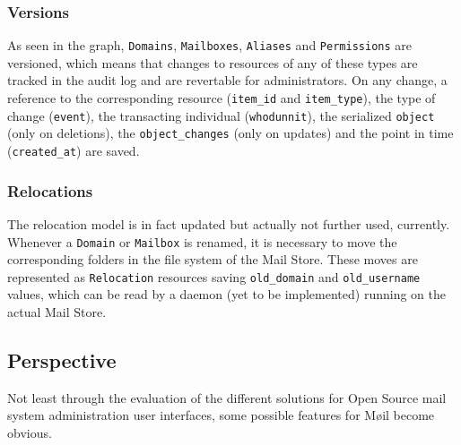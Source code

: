 \documentclass[12pt,a4paper]{scrartcl}
\begin{document}
			\subsubsection*{Versions}
				As seen in the graph, \texttt{Domains}, \texttt{Mailboxes},
				\texttt{Aliases} and \texttt{Permissions} are versioned, which
				means that changes to resources of any of these types are
				tracked in the audit log and are revertable for administrators.
				On any change, a reference to the corresponding resource
				(\texttt{item\_id} and \texttt{item\_type}), the type of change
				(\texttt{event}), the transacting individual
				(\texttt{whodunnit}), the serialized \texttt{object} (only on
				deletions), the \texttt{object\_changes} (only on updates) and
				the point in time (\texttt{created\_at}) are saved.

			\subsubsection*{Relocations}
			\label{sec:moeil:model:relocation}
				The relocation model is in fact updated but actually not
				further used, currently. Whenever a \texttt{Domain} or
				\texttt{Mailbox} is renamed, it is necessary to move the
				corresponding folders in the file system of the Mail Store.
				These moves are represented as \texttt{Relocation} resources
				saving \texttt{old\_domain} and \texttt{old\_username} values,
				which can be read by a daemon (yet to be implemented) running
				on the actual Mail Store.


		\subsection*{Perspective}
			Not least through the evaluation of the different solutions for
			Open Source mail system administration user interfaces, some
			possible features for Møil become obvious.
\end{document}
